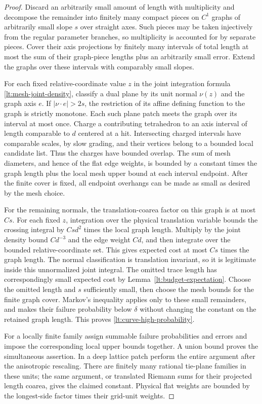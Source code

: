 \documentclass[11pt]{article}
\numberwithin{equation}{section}
\theoremstyle{definition}
\theoremstyle{remark}
\begin{document}
\begin{proof}
Discard an arbitrarily small amount of length with multiplicity
and decompose the remainder into finitely many compact pieces on
$C^1$ graphs of arbitrarily small slope $s$ over straight axes.
Such pieces may be taken injectively from the regular parameter
branches, so multiplicity is accounted for by separate pieces.
Cover their axis projections by finitely many intervals of total
length at most the sum of their graph-piece lengths plus an
arbitrarily small error.  Extend the graphs over these intervals
with comparably small slopes.

For each fixed relative-coordinate value $z$ in the joint
integration formula \eqref{lt:mesh-joint-density}, classify a dual
plane by its unit normal $\nu(z)$ and the graph axis $e$.  If
$|\nu\cdot e|>2s$, the restriction of its affine defining function
to the graph is strictly monotone.  Each such plane patch meets
the graph over its interval at most once.  Charge a contributing
tetrahedron to an axis interval of length comparable to $d$
centered at a hit.  Intersecting charged intervals have comparable
scales, by slow grading, and their vertices belong to a bounded
local candidate list.  Thus the charges have bounded overlap.
The sum of mesh diameters, and hence of the flat edge weights,
is bounded by a constant times the graph length plus the local
mesh upper bound at each interval endpoint.  After the finite
cover is fixed, all endpoint overhangs can be made as small as
desired by the mesh choice.

For the remaining normals, the translation-coarea factor on this
graph is at most $Cs$.  For each fixed $z$, integration over the
physical translation variable bounds the crossing integral by
$Cs d^2$ times the local graph length.  Multiply by the joint
density bound $Cd^{-3}$ and the edge weight $Cd$, and then
integrate over the bounded relative-coordinate set.  This gives
expected cost at most $Cs$ times the graph length.  The normal
classification is translation invariant, so it is legitimate
inside this unnormalized joint integral.  The omitted trace length has correspondingly
small expected cost by Lemma~\ref{lt:budget-expectation}.  Choose the omitted length
and $s$ sufficiently small, then choose the mesh bounds for the
finite graph cover.  Markov's inequality applies only to these
small remainders, and makes their failure probability below
$\delta$ without changing the constant on the retained graph
length.  This proves \eqref{lt:curve-high-probability}.

For a locally finite family assign summable failure probabilities
and errors and impose the corresponding local upper bounds
together.  A union bound proves the simultaneous assertion.
In a deep lattice patch perform the entire argument after the
anisotropic rescaling.  There are finitely many rational tie-plane
families in these units; the same argument, or translated Riemann
sums for their projected length coarea, gives the claimed constant.
Physical flat weights are bounded by the longest-side factor
times their grid-unit weights.
\end{proof}
\end{document}
